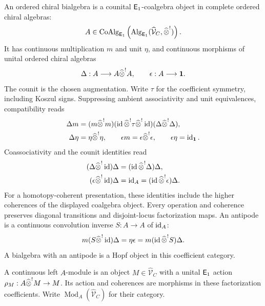 \begin{definition}\label{def:vol4-ordered-chiral-bialgebra}
An ordered chiral bialgebra is a counital $\mathsf E_1$-coalgebra object
in complete ordered chiral algebras:
\[
 A\in\operatorname{CoAlg}_{\mathsf E_1}
 \left(\operatorname{Alg}_{\mathsf E_1}
 (\widehat{\mathcal V}_C,\widehat{\otimes}^{!})\right).
\]
It has continuous multiplication $m$ and unit $\eta$, and continuous
morphisms of unital ordered chiral algebras
\[
 \Delta:A\longrightarrow A\widehat{\otimes}^{!}A,
 \qquad \epsilon:A\longrightarrow\mathbf1.
\]
The counit is the chosen augmentation.
Write $\tau$ for the coefficient symmetry, including Koszul signs.
Suppressing ambient associativity and unit equivalences, compatibility reads
\[
\begin{aligned}
 \Delta m&=(m\widehat{\otimes}^{!}m)
  (\operatorname{id}\widehat{\otimes}^{!}\tau\widehat{\otimes}^{!}\operatorname{id})
  (\Delta\widehat{\otimes}^{!}\Delta),\\
 \Delta\eta&=\eta\widehat{\otimes}^{!}\eta,
 \qquad \epsilon m=\epsilon\widehat{\otimes}^{!}\epsilon,
 \qquad \epsilon\eta=\operatorname{id}_{\mathbf1}.
\end{aligned}
\]
Coassociativity and the counit identities read
\[
\begin{aligned}
 (\Delta\widehat{\otimes}^{!}\operatorname{id})\Delta
   &=(\operatorname{id}\widehat{\otimes}^{!}\Delta)\Delta,\\
 (\epsilon\widehat{\otimes}^{!}\operatorname{id})\Delta
   &=\operatorname{id}_A=(\operatorname{id}\widehat{\otimes}^{!}\epsilon)\Delta.
\end{aligned}
\]
For a homotopy-coherent presentation, these identities include the
higher coherences of the displayed coalgebra object.
Every operation and coherence preserves diagonal transitions and
disjoint-locus factorization maps.
An antipode is a continuous convolution inverse $S:A\to A$ of $\operatorname{id}_A$:
\[
 m(S\widehat{\otimes}^{!}\operatorname{id})\Delta
 =\eta\epsilon
 =m(\operatorname{id}\widehat{\otimes}^{!}S)\Delta.
\]
A bialgebra with an antipode is a Hopf object in this coefficient category.
\end{definition}

A continuous left $A$-module is an object $M\in\widehat{\mathcal V}_C$
with a unital $\mathsf E_1$ action
$\rho_M:A\widehat{\otimes}^{!}M\to M$.
Its action and coherences are morphisms in these factorization coefficients.
Write $\operatorname{Mod}_A(\widehat{\mathcal V}_C)$ for their category.

